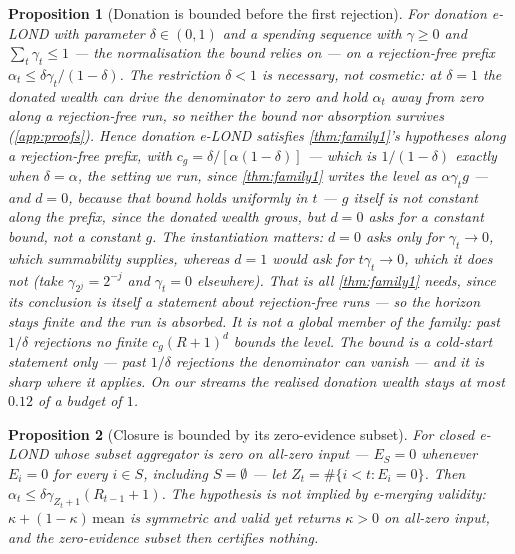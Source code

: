 \documentclass[conference]{IEEEtran}
\newtheorem{proposition}{Proposition}
\newcommand{\alphat}{\alpha_t}
\begin{document}
\begin{proposition}[Donation is bounded before the first rejection]\label{prop:donation}
For donation e-LOND with parameter $\delta\in(0,1)$ and a spending sequence with $\gamma\ge0$ and
$\sum_t\gamma_t\le1$ --- the normalisation the bound relies on --- on a rejection-free prefix
$\alphat\le\delta\gamma_t/(1-\delta)$. The restriction $\delta<1$ is necessary, not cosmetic: at
$\delta=1$ the donated wealth can drive the denominator to zero and hold $\alphat$ away from zero
along a rejection-free run, so neither the bound nor absorption survives (\cref{app:proofs}). Hence donation e-LOND satisfies \cref{thm:family1}'s hypotheses \emph{along a rejection-free prefix},
with $c_g=\delta/[\alpha(1-\delta)]$ --- which is $1/(1-\delta)$ exactly when $\delta=\alpha$, the setting
we run, since \cref{thm:family1} writes the level as $\alpha\gamma_t g$ --- and $d=0$, because
that bound holds uniformly in $t$ --- $g$ itself is not constant along the prefix, since the donated
wealth grows, but $d=0$ asks for a constant bound, not a constant $g$. The instantiation matters: $d=0$ asks only for
$\gamma_t\to0$, which summability supplies, whereas $d=1$ would ask for $t\gamma_t\to0$, which it does
not (take $\gamma_{2^j}=2^{-j}$ and $\gamma_t=0$ elsewhere). That is all \cref{thm:family1} needs, since its conclusion is
itself a statement about rejection-free runs --- so the horizon stays finite and the run is absorbed. It is
\emph{not} a global member of the family: past $1/\delta$ rejections no finite $c_g(R+1)^d$ bounds the
level. The bound is a
cold-start statement only --- past $1/\delta$ rejections the denominator can vanish --- and it is sharp
where it applies. On our streams the realised donation wealth stays at most $0.12$ of a budget of $1$.
\end{proposition}

\begin{proposition}[Closure is bounded by its zero-evidence subset]\label{prop:closure}
For closed e-LOND whose subset aggregator is zero on all-zero input --- $E_S=0$ whenever $E_i=0$ for
every $i\in S$, including $S=\emptyset$ --- let $Z_t=\#\{i<t:E_i=0\}$. Then
$\alphat\le\delta\gamma_{Z_t+1}(R_{t-1}+1)$. The hypothesis is not implied by e-merging validity:
$\kappa+(1-\kappa)\,\mathrm{mean}$ is symmetric and valid yet returns $\kappa>0$ on all-zero input,
and the zero-evidence subset then certifies nothing.
\end{proposition}
\end{document}
